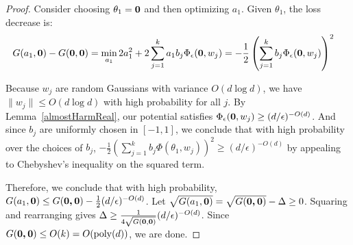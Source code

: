 \almostharminitialize*

 \begin{proof}
  Consider choosing $\theta_1 = {\bf 0}$ and then
  optimizing $a_1$. Given $\theta_1$, the loss decrease is:
%
\begin{align*}
   G(a_1,{\bf 0}) - G({\bf 0},{\bf 0}) & = \min_{a_1} 2a_1^2 +
  2\sum_{j=1}^k a_1 b_j\Phi_\epsilon({\bf 0},w_j) 
 = -\frac{1}{2}\left(  \sum_{j=1}^k b_j
   \Phi_\epsilon({\bf 0},w_j)\right)^2 
\end{align*}

Because $w_j$ are random Gaussians with variance $O(d \log d)$, we have $\|w_j\| \leq O(d\log d)$  with high probability for all $j$. By Lemma~\ref{almostHarmReal}, our potential satisfies ${\Phi}_\epsilon({\bf 0}, w_j) \geq (d/\epsilon)^{ - O(d)}$. And since $b_j$ are uniformly chosen in $[-1,1]$, we conclude that with high probability over the choices of $b_j$, $-\frac{1}{2}\left( \sum_{j=1}^k b_j\Phi(\theta_1,w_j)\right)^2 \geq (d/\epsilon)^{ - O(d)}$ by appealing to Chebyshev's inequality on the squared term. 


Therefore, we conclude that with high probability, $G(a_1, {\bf 0}) \leq G(\boldsymbol{0,0}) - \frac{1}{2}(d/\epsilon)^{ - O(d)}$. Let $\sqrt{G(a_1, {\bf 0})} = \sqrt{G(\boldsymbol{0,0})} - \Delta \geq 0$. Squaring and rearranging gives $\Delta \geq \frac{1}{4\sqrt{G({\bf 0, 0})}}(d/\epsilon)^{ - O(d)}$. Since $G(\boldsymbol{0,0}) \leq O(k) = O(\mathrm{poly}(d))$, we are done. 
\end{proof}
%
%



